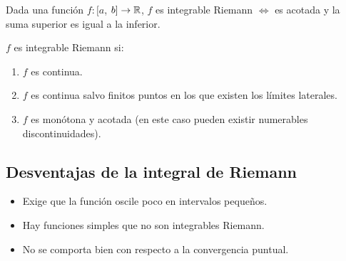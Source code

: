 \begin{prop}
    Dada una función $f: [a$, $b] \to \mathbb{R}$, $f$ es integrable Riemann $\iff$ es acotada y la suma superior es igual a la inferior.
\end{prop}

\begin{note}
    $f$ es integrable Riemann si: \begin{enumerate}
        \item $f$ es continua.
        \item $f$ es continua salvo finitos puntos en los que existen los límites laterales.
        \item $f$ es monótona y acotada (en este caso pueden existir numerables discontinuidades).
    \end{enumerate}
\end{note}

\subsection{Desventajas de la integral de Riemann}
\begin{itemize}
    \item Exige que la función oscile poco en intervalos pequeños.
    \item Hay funciones simples que no son integrables Riemann.
    \item No se comporta bien con respecto a la convergencia puntual.
\end{itemize}


